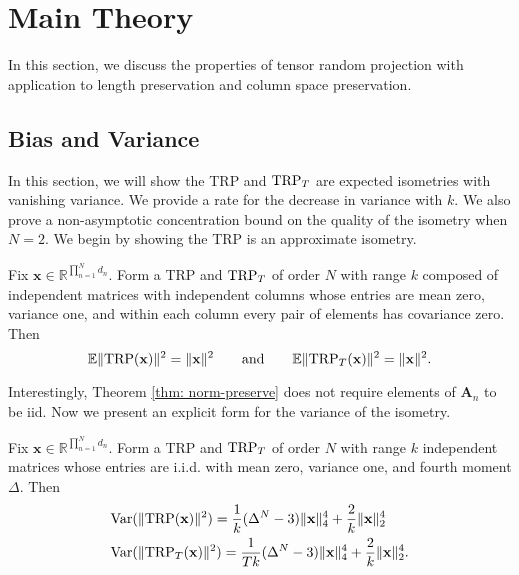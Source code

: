 \section{Main Theory}
In this section, we discuss the properties of tensor random projection with application to length preservation and column space preservation.  


\subsection{Bias and Variance}
In this section, we will show the TRP and $\textup{TRP}_T$ are expected isometries with vanishing variance.
We provide a rate for the decrease in variance with $k$.
We also prove a non-asymptotic concentration bound on the quality of the isometry when $N=2$.
We begin by showing the TRP is an approximate isometry.
\begin{thm}
\label{thm: norm-preserve}
Fix $\mathbf{x} \in \mathbb{R}^{\prod_{n=1}^N d_n}$.
Form a TRP and $\textup{TRP}_T$ of order $N$ with range $k$
composed of independent matrices with independent columns
whose entries are mean zero, variance one, and within each column every pair of elements has covariance zero.
Then
\begin{equation}
\label{eq:lemma-invariant-length-statement}
\mathbb{E} \|\textup{TRP}(\mathbf{x})\|^2 = \|\mathbf{x}\|^2 \qquad \text{and} \qquad  \mathbb{E} \|
\textup{TRP}_T(\mathbf{x})\|^2 = \|\mathbf{x}\|^2. \nonumber
\end{equation}
\end{thm}
Interestingly, Theorem \ref{thm: norm-preserve} does not require elements of $\mathbf{A}_n$ to be iid.
Now we present an explicit form for the variance of the isometry.
\begin{thm}
\label{thm:variance}
Fix $\mathbf{x} \in \mathbb{R}^{\prod_{n=1}^N d_n}$.
Form a \textup{TRP} and $\textup{TRP}_T$ of order $N$ with range $k$
independent matrices whose entries are i.i.d. with
mean zero, variance one, and fourth moment $\Delta$.
Then
\begin{equation*}
\begin{aligned}
& \mbox{Var}(\|\textup{TRP}(\mathbf{x})\|^2) = \frac{1}{k}(\Delta^N-3)\|\mathbf{x}\|_4^4 + \frac{2}{k}\|\mathbf{x}\|_2^4 \\
& \mbox{Var}(\|\textup{TRP}_T(\mathbf{x})\|^2) = \frac{1}{Tk}(\Delta^N-3)\|\mathbf{x}\|_4^4 + \frac{2}{k}\|\mathbf{x}\|_2^4.
\end{aligned}
\end{equation*}
\end{thm}
